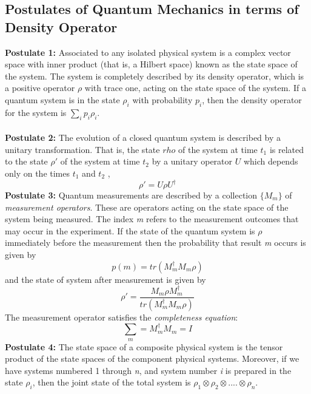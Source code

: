 \subsection{Postulates of Quantum Mechanics in terms of\\ Density Operator}
{\bf Postulate 1: } Associated to any isolated physical system is a complex vector space with inner product (that is, a Hilbert space) known as the state space of the system. The system is completely described by its density operator, which is a positive operator $\rho$ with trace one, acting on the state space of the system. If a quantum system is in the state $\rho_i$ with probability $p_i$, then the density operator for the system is $\sum_i p_i \rho_i$.\\\\
{\bf Postulate 2: }The evolution of a closed quantum system is described by a unitary
transformation. That is, the state $rho$ of the system at time $t_1$ is related to the state $\rho'$ of the system at time $t_2$ by a unitary operator $U$ which depends only on the times $t_1$ and $t_2$ ,
\begin{equation}
\rho ' = U \rho U^{\dagger}
\end{equation}
{\bf Postulate 3: }Quantum measurements are described by a collection $\{M_m\}$ of {\it measurement operators}. These are operators acting on the state space of the system being measured. The index {\it m} refers to the measurement outcomes that may occur in the experiment. If the state of the quantum system is $\rho$ immediately before the measurement then the probability that result \textit{m} occurs is given by
\begin{equation}
p(m) = tr(M_m^\dagger M_m \rho)
\end{equation}and the state of system after measurement is given by
\begin{equation}
\rho ' = \frac{M_m \rho M_m^\dagger}{ tr(M_m^\dagger M_m \rho)}
\end{equation}
The measurement operator satisfies the \textit{completeness equation}:
\[ \sum_m = M_m^\dagger M_m = I\]
{\bf Postulate 4: }The state space of a composite physical system is the tensor product of the state spaces of the component physical systems. Moreover, if we have systems numbered 1 through \textit{n}, and system number \textit{i} is prepared in the state $\rho_i$, then the joint state of the total system is $\rho_1 \otimes \rho_2 \otimes .... \otimes \rho_n$.\\

